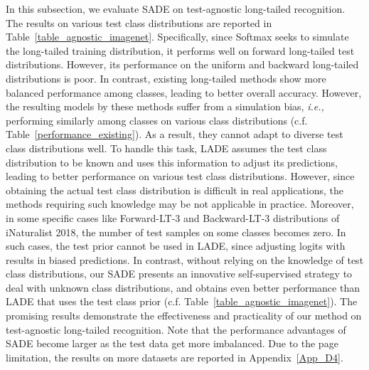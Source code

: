 \documentclass{article}
\def\ie{\emph{i.e.}} \def\Ie{\emph{I.e.}}
\def\ie{\emph{i.e., }}
\begin{document}
In this subsection, we evaluate   SADE on test-agnostic long-tailed recognition.  The   results  on    various  test class distributions are reported in Table~\ref{table_agnostic_imagenet}. 
Specifically, since Softmax  seeks to simulate  the long-tailed training    distribution,  it performs well on forward long-tailed test   distributions. However, its performance  on the uniform and backward long-tailed distributions is poor. In contrast, existing long-tailed methods   show more  balanced performance among classes, leading to better overall accuracy. However, the resulting models by these methods   suffer from a simulation bias, \ie performing similarly among classes on various  class distributions (c.f. Table~\ref{performance_existing}). As a result, they cannot adapt to diverse test  class distributions well.
To handle this task, LADE assumes the test class distribution to be known and 
uses this information to adjust its predictions,  leading to better performance on various   test class distributions. However, since  obtaining the actual test class distribution is difficult in real applications,   the methods requiring such knowledge  may be not applicable in practice. 
Moreover, in some specific cases like Forward-LT-3 and Backward-LT-3 distributions of iNaturalist 2018,  the  number of test samples on some   classes becomes zero.  In such cases, the test prior cannot be used in LADE, since adjusting logits with    results in   biased predictions. 
In contrast,  without   relying on the knowledge of test class distributions, our  SADE presents an innovative  self-supervised strategy to deal with unknown class distributions, and    obtains even   better performance than LADE that uses the test class prior (c.f. Table~\ref{table_agnostic_imagenet}). 
The promising  results demonstrate the effectiveness and  practicality of our  method on test-agnostic long-tailed recognition.  Note that  the performance advantages of SADE    become larger   as the test data  get  more imbalanced.   Due to the page limitation, the   results on more datasets  are reported in Appendix~\ref{App_D4}.
  
 
 
\end{document}
